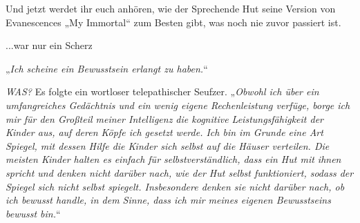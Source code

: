 
\begin{chapterOpeningAuthorNote}
% 
Und jetzt werdet ihr euch anhören, wie der Sprechende Hut seine Version von Evanescences „My Immortal“ zum Besten gibt, was noch nie zuvor passiert ist.

...war nur ein Scherz
\end{chapterOpeningAuthorNote}


\hplettrineextrapara
„\emph{Ich scheine ein Bewusstsein erlangt zu haben.}“

\emph{WAS?}
Es folgte ein wortloser telepathischer Seufzer. „\emph{Obwohl ich über ein umfangreiches Gedächtnis und ein wenig eigene Rechenleistung verfüge, borge ich mir für den Großteil meiner Intelligenz die kognitive Leistungsfähigkeit der Kinder aus, auf deren Köpfe ich gesetzt werde. Ich bin im Grunde eine Art Spiegel, mit dessen Hilfe die Kinder \emph{sich selbst} auf die Häuser verteilen. Die meisten Kinder halten es einfach für selbstverständlich, dass ein Hut mit ihnen spricht und denken nicht darüber nach, wie der Hut \emph{selbst} funktioniert, sodass der Spiegel sich nicht selbst spiegelt. \emph{Insbesondere} denken sie nicht darüber nach, ob ich bewusst handle, in dem Sinne, dass ich mir meines eigenen Bewusstseins bewusst bin.}“

